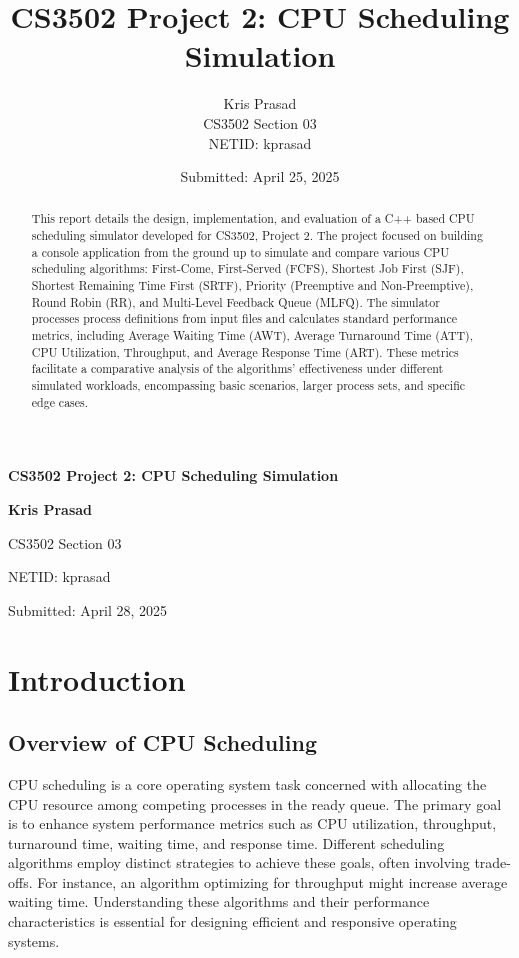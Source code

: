 \documentclass[12pt]{article}
\title{CS3502 Project 2: CPU Scheduling Simulation}
\author{Kris Prasad \\[0.5em]
CS3502 Section 03 \\[0.5em]
NETID: kprasad\\[0.5em]
}
\date{Submitted: April 25, 2025}
\begin{document}
\begin{titlepage}
    \centering
    \vspace*{2cm}
    
    {\LARGE\bfseries CS3502 Project 2: CPU Scheduling Simulation\par}
    \vspace{2cm}
    
    {\large\bfseries Kris Prasad\par}
    \vspace{0.5cm}
    {\large CS3502 Section 03\par}
    \vspace{0.5cm}
    {\large NETID: kprasad\par}
    \vspace{2cm}
    
    {\large Submitted: April 28, 2025\par}
    
    \vfill
    
\end{titlepage}

\newpage

\begin{abstract}
This report details the design, implementation, and evaluation of a C++ based CPU scheduling simulator developed for CS3502, Project 2. The project focused on building a console application from the ground up to simulate and compare various CPU scheduling algorithms: First-Come, First-Served (FCFS), Shortest Job First (SJF), Shortest Remaining Time First (SRTF), Priority (Preemptive and Non-Preemptive), Round Robin (RR), and Multi-Level Feedback Queue (MLFQ). The simulator processes process definitions from input files and calculates standard performance metrics, including Average Waiting Time (AWT), Average Turnaround Time (ATT), CPU Utilization, Throughput, and Average Response Time (ART). These metrics facilitate a comparative analysis of the algorithms' effectiveness under different simulated workloads, encompassing basic scenarios, larger process sets, and specific edge cases.
\end{abstract}

\section{Introduction}
\subsection{Overview of CPU Scheduling}
CPU scheduling is a core operating system task concerned with allocating the CPU resource among competing processes in the ready queue. The primary goal is to enhance system performance metrics such as CPU utilization, throughput, turnaround time, waiting time, and response time. Different scheduling algorithms employ distinct strategies to achieve these goals, often involving trade-offs. For instance, an algorithm optimizing for throughput might increase average waiting time. Understanding these algorithms and their performance characteristics is essential for designing efficient and responsive operating systems.
\end{document}

